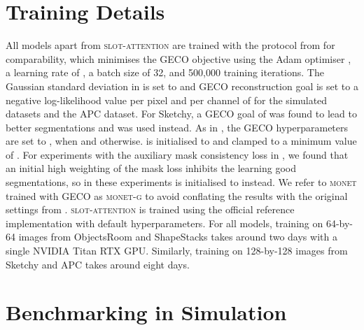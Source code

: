 \documentclass{article}
\begin{document}
\section{Training Details}
\label{app:training}

All models apart from \textsc{slot-attention} are trained with the protocol from \citet{engelcke2020genesis} for comparability, which minimises the GECO objective \cite{rezende2018taming} using the Adam optimiser \citep{kingma2014adam}, a learning rate of , a batch size of 32, and 500,000 training iterations.
The Gaussian standard deviation  in  is set to  and GECO reconstruction goal is set to a negative log-likelihood value per pixel and per channel of  for the simulated datasets and the APC dataset.
For Sketchy, a GECO goal of  was found to lead to better segmentations and was used instead.
As in \citet{engelcke2020genesis}, the GECO hyperparameters are set to ,  when  and  otherwise.
 is initialised to  and clamped to a minimum value of .
For experiments with the auxiliary mask consistency loss in , we found that an initial high weighting of the mask loss inhibits the learning good segmentations, so in these experiments  is initialised to  instead.
We refer to \textsc{monet} trained with GECO as \textsc{monet-g} to avoid conflating the results with the original settings from \citet{burgess2019monet}.
\textsc{slot-attention} is trained using the official reference implementation with default hyperparameters.
For all models, training on 64-by-64 images from ObjectsRoom and ShapeStacks takes around two days with a single NVIDIA Titan RTX GPU.
Similarly, training on 128-by-128 images from Sketchy and APC takes around eight days.



\section{Benchmarking in Simulation}
\label{app:simulation}
\end{document}
